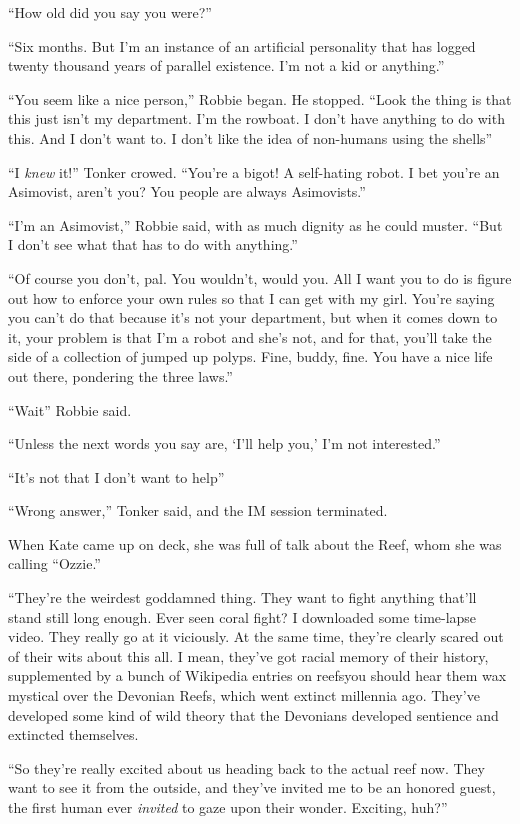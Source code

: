 “How old did you say you were?”

“Six months. But I’m an instance of an artificial personality that
has logged twenty thousand years of parallel existence. I’m not a
kid or anything.”

“You seem like a nice person,” Robbie began. He stopped. “Look the
thing is that this just isn’t my department. I’m the rowboat. I
don’t have anything to do with this. And I don’t want to. I don’t
like the idea of non-humans using the shells\dash{}”

“I \emph{knew} it!” Tonker crowed. “You’re a bigot! A self-hating
robot. I bet you’re an Asimovist, aren’t you? You people are always
Asimovists.”

“I’m an Asimovist,” Robbie said, with as much dignity as he could
muster. “But I don’t see what that has to do with anything.”

“Of course you don’t, pal. You wouldn’t, would you. All I want you
to do is figure out how to enforce your own rules so that I can get
with my girl. You’re saying you can’t do that because it’s not your
department, but when it comes down to it, your problem is that I’m
a robot and she’s not, and for that, you’ll take the side of a
collection of jumped up polyps. Fine, buddy, fine. You have a nice
life out there, pondering the three laws.”

“Wait\dash{}” Robbie said.

“Unless the next words you say are, ‘I’ll help you,’ I’m not
interested.”

“It’s not that I don’t want to help\dash{}”

“Wrong answer,” Tonker said, and the IM session terminated.

\tb

When Kate came up on deck, she was full of talk about the Reef,
whom she was calling “Ozzie.”

“They’re the weirdest goddamned thing. They want to fight anything
that’ll stand still long enough. Ever seen coral fight? I
downloaded some time-lapse video. They really go at it viciously.
At the same time, they’re clearly scared out of their wits about
this all. I mean, they’ve got racial memory of their history,
supplemented by a bunch of Wikipedia entries on reefs\dash{}you should
hear them wax mystical over the Devonian Reefs, which went extinct
millennia ago. They’ve developed some kind of wild theory that the
Devonians developed sentience and extincted themselves.

“So they’re really excited about us heading back to the actual reef
now. They want to see it from the outside, and they’ve invited me
to be an honored guest, the first human ever \emph{invited} to gaze
upon their wonder. Exciting, huh?”


